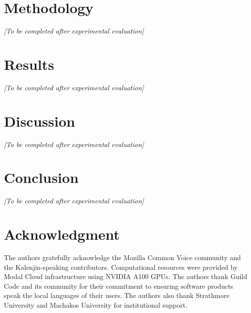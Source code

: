 \documentclass[conference]{IEEEtran}
\begin{document}
\section{Methodology}
\textit{[To be completed after experimental evaluation]}

\section{Results}
\textit{[To be completed after experimental evaluation]}

\section{Discussion}
\textit{[To be completed after experimental evaluation]}

\section{Conclusion}
\textit{[To be completed after experimental evaluation]}

\section*{Acknowledgment}
The authors gratefully acknowledge the Mozilla Common Voice community and the Kalenjin-speaking contributors. Computational resources were provided by Modal Cloud infrastructure using NVIDIA A100 GPUs. The authors thank Guild Code and its community for their commitment to ensuring software products speak the local languages of their users. The authors also thank Strathmore University and Machakos University for institutional support.



\end{document}
